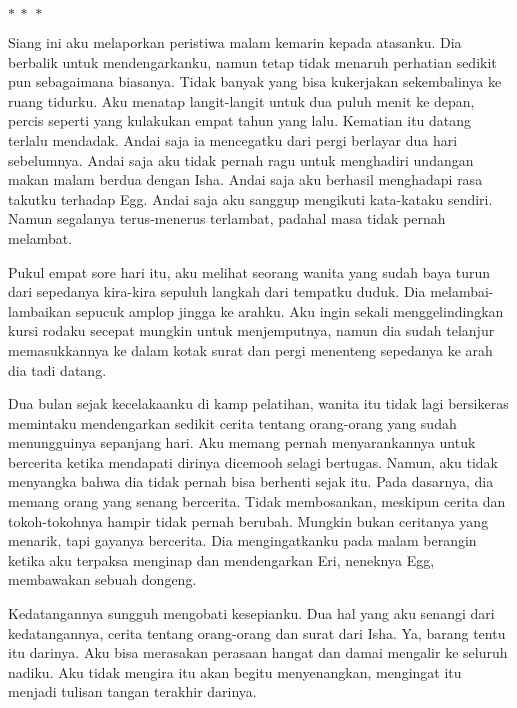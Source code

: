\documentclass[smalldemyvopaper,11pt,twoside,onecolumn,openright,extrafontsizes]{memoir}
\newcommand\separator{
  \begin{center}
    \(\ast~\ast~\ast\)
  \end{center}
}
\begin{document}
\separator{}


Siang ini aku melaporkan peristiwa malam kemarin kepada atasanku. Dia berbalik untuk mendengarkanku, namun tetap tidak menaruh perhatian sedikit pun sebagaimana biasanya. Tidak banyak yang bisa kukerjakan sekembalinya ke ruang tidurku. Aku menatap langit-langit untuk dua puluh menit ke depan, percis seperti yang kulakukan empat tahun yang lalu. Kematian itu datang terlalu mendadak. Andai saja ia mencegatku dari pergi berlayar dua hari sebelumnya. Andai saja aku tidak pernah ragu untuk menghadiri undangan makan malam berdua dengan Isha. Andai saja aku berhasil menghadapi rasa takutku terhadap Egg. Andai saja aku sanggup mengikuti kata-kataku sendiri. Namun segalanya terus-menerus terlambat, padahal masa tidak pernah melambat.


Pukul empat sore hari itu, aku melihat seorang wanita yang sudah baya turun dari sepedanya kira-kira sepuluh langkah dari tempatku duduk. Dia melambai-lambaikan sepucuk amplop jingga ke arahku. Aku ingin sekali menggelindingkan kursi rodaku secepat mungkin untuk menjemputnya, namun dia sudah telanjur memasukkannya ke dalam kotak surat dan pergi menenteng sepedanya ke arah dia tadi datang.


Dua bulan sejak kecelakaanku di kamp pelatihan, wanita itu tidak lagi bersikeras memintaku mendengarkan sedikit cerita tentang orang-orang yang sudah menungguinya sepanjang hari. Aku memang pernah menyarankannya untuk bercerita ketika mendapati dirinya dicemooh selagi bertugas. Namun, aku tidak menyangka bahwa dia tidak pernah bisa berhenti sejak itu. Pada dasarnya, dia memang orang yang senang bercerita. Tidak membosankan, meskipun cerita dan tokoh-tokohnya hampir tidak pernah berubah. Mungkin bukan ceritanya yang menarik, tapi gayanya bercerita. Dia mengingatkanku pada malam berangin ketika aku terpaksa menginap dan mendengarkan Eri, neneknya Egg, membawakan sebuah dongeng.


Kedatangannya sungguh mengobati kesepianku. Dua hal yang aku senangi dari kedatangannya, cerita tentang orang-orang dan surat dari Isha. Ya, barang tentu itu darinya. Aku bisa merasakan perasaan hangat dan damai mengalir ke seluruh nadiku. Aku tidak mengira itu akan begitu menyenangkan, mengingat itu menjadi tulisan tangan terakhir darinya.
\end{document}
